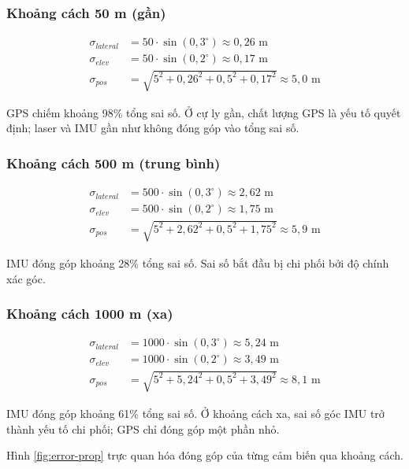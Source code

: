 \subsubsection{Khoảng cách 50 m (gần)}
\begin{align*}
\sigma_{lateral} &= 50 \cdot \sin(0{,}3^\circ) \approx 0{,}26 \text{ m} \\
\sigma_{elev} &= 50 \cdot \sin(0{,}2^\circ) \approx 0{,}17 \text{ m} \\
\sigma_{pos} &= \sqrt{5^2 + 0{,}26^2 + 0{,}5^2 + 0{,}17^2} \approx 5{,}0 \text{ m}
\end{align*}

GPS chiếm khoảng 98\% tổng sai số. Ở cự ly gần, chất lượng GPS là yếu tố quyết định; laser và IMU gần như không đóng góp vào tổng sai số.

\subsubsection{Khoảng cách 500 m (trung bình)}
\begin{align*}
\sigma_{lateral} &= 500 \cdot \sin(0{,}3^\circ) \approx 2{,}62 \text{ m} \\
\sigma_{elev} &= 500 \cdot \sin(0{,}2^\circ) \approx 1{,}75 \text{ m} \\
\sigma_{pos} &= \sqrt{5^2 + 2{,}62^2 + 0{,}5^2 + 1{,}75^2} \approx 5{,}9 \text{ m}
\end{align*}

IMU đóng góp khoảng 28\% tổng sai số. Sai số bắt đầu bị chi phối bởi độ chính xác góc.

\subsubsection{Khoảng cách 1000 m (xa)}
\begin{align*}
\sigma_{lateral} &= 1000 \cdot \sin(0{,}3^\circ) \approx 5{,}24 \text{ m} \\
\sigma_{elev} &= 1000 \cdot \sin(0{,}2^\circ) \approx 3{,}49 \text{ m} \\
\sigma_{pos} &= \sqrt{5^2 + 5{,}24^2 + 0{,}5^2 + 3{,}49^2} \approx 8{,}1 \text{ m}
\end{align*}

IMU đóng góp khoảng 61\% tổng sai số. Ở khoảng cách xa, sai số góc IMU trở thành yếu tố chi phối; GPS chỉ đóng góp một phần nhỏ.

Hình \ref{fig:error-prop} trực quan hóa đóng góp của từng cảm biến qua khoảng cách.



